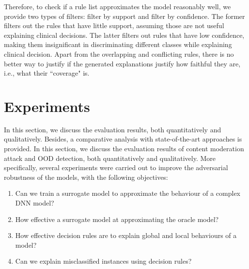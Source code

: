 \hspace*{3.5mm} Therefore, to check if a rule list approximates the model reasonably well, we provide two types of filters: filter by support and filter by confidence. The former filters out the rules that have little support, assuming those are not useful explaining clinical decisions. The latter filters out rules that have low confidence, making them insignificant in discriminating different classes while explaining clinical decision. Apart from the overlapping and conflicting rules, there is no better way to justify if the generated explanations justify how faithful they are, i.e., what their ``coverage" is. 



\section{Experiments} \label{chapter_7:results}
In this section, we discuss the evaluation results, both quantitatively and qualitatively. Besides, a comparative analysis with state-of-the-art approaches is provided. In this section, we discuss the evaluation results of content moderation attack and OOD detection, both quantitatively and qualitatively. %
More specifically, several experiments were carried out to improve the adversarial robustness of the models, with the following objectives:

\begin{enumerate}[noitemsep]
    \item Can we train a surrogate model to approximate the behaviour of a complex DNN model? 
    \item How effective a surrogate model at approximating the oracle model?  
    \item How effective decision rules are to explain global and local behaviours of a model?   
    \item Can we explain misclassified instances using decision rules? 
\end{enumerate}

